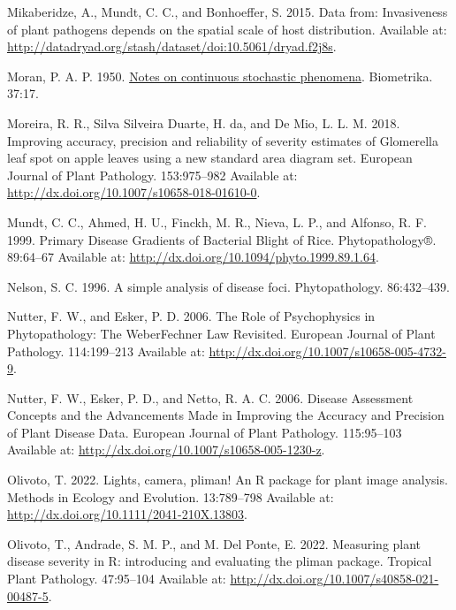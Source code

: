 \documentclass[
  letterpaper,
  DIV=11,
  numbers=noendperiod]{scrreprt}
\newlength{\cslhangindent}
\newlength{\cslentryspacingunit} %
\newenvironment{CSLReferences}[2] %
 {%
  \setlength{\parindent}{0pt}
  \ifodd #1
  \let\oldpar\par
  \def\par{\hangindent=\cslhangindent\oldpar}
  \fi
  \setlength{\parskip}{#2\cslentryspacingunit}
 }%
 {}
\begin{document}
\begin{CSLReferences}{0}{0}
\leavevmode{}%
Mikaberidze, A., Mundt, C. C., and Bonhoeffer, S. 2015. Data from:
Invasiveness of plant pathogens depends on the spatial scale of host
distribution. Available at:
\url{http://datadryad.org/stash/dataset/doi:10.5061/dryad.f2j8s}.

\leavevmode{}%
Moran, P. A. P. 1950. \href{https://doi.org/10.2307/2332142}{Notes on
continuous stochastic phenomena}. Biometrika. 37:17.

\leavevmode{}%
Moreira, R. R., Silva Silveira Duarte, H. da, and De Mio, L. L. M. 2018.
Improving accuracy, precision and reliability of severity estimates of
Glomerella leaf spot on apple leaves using a new standard area diagram
set. European Journal of Plant Pathology. 153:975--982 Available at:
\url{http://dx.doi.org/10.1007/s10658-018-01610-0}.

\leavevmode{}%
Mundt, C. C., Ahmed, H. U., Finckh, M. R., Nieva, L. P., and Alfonso, R.
F. 1999. Primary Disease Gradients of Bacterial Blight of Rice.
Phytopathology®. 89:64--67 Available at:
\url{http://dx.doi.org/10.1094/phyto.1999.89.1.64}.

\leavevmode{}%
Nelson, S. C. 1996. A simple analysis of disease foci. Phytopathology.
86:432--439.

\leavevmode{}%
Nutter, F. W., and Esker, P. D. 2006. The Role of Psychophysics in
Phytopathology: The Weber{\textendash}Fechner Law Revisited. European
Journal of Plant Pathology. 114:199--213 Available at:
\url{http://dx.doi.org/10.1007/s10658-005-4732-9}.

\leavevmode{}%
Nutter, F. W., Esker, P. D., and Netto, R. A. C. 2006. Disease
Assessment Concepts and the Advancements Made in Improving the Accuracy
and Precision of Plant Disease Data. European Journal of Plant
Pathology. 115:95--103 Available at:
\url{http://dx.doi.org/10.1007/s10658-005-1230-z}.

\leavevmode{}%
Olivoto, T. 2022. Lights, camera, pliman! An R package for plant image
analysis. Methods in Ecology and Evolution. 13:789--798 Available at:
\url{http://dx.doi.org/10.1111/2041-210X.13803}.

\leavevmode{}%
Olivoto, T., Andrade, S. M. P., and M. Del Ponte, E. 2022. Measuring
plant disease severity in R: introducing and evaluating the pliman
package. Tropical Plant Pathology. 47:95--104 Available at:
\url{http://dx.doi.org/10.1007/s40858-021-00487-5}.


\end{CSLReferences}
\end{document}
